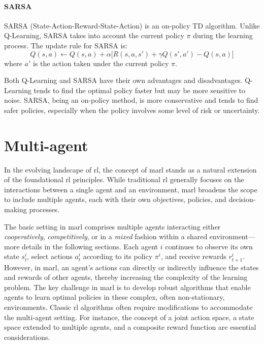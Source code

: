  \paragraph*{SARSA}
 SARSA (State-Action-Reward-State-Action) is an on-policy TD algorithm. 
  Unlike Q-Learning, SARSA takes into account the current policy \(\pi\) during the learning process. The update rule for SARSA is:
 \begin{equation}
 Q(s, a) \leftarrow Q(s, a) + \alpha \Big[ R(s, a, s') + \gamma Q(s', a') - Q(s, a) \Big]
 \end{equation}
 where \(a'\) is the action taken under the current policy \(\pi\).
 
 Both Q-Learning and SARSA have their own advantages and disadvantages. 
  Q-Learning tends to find the optimal policy faster but may be more sensitive to noise. SARSA, being an on-policy method, is more conservative and tends to find safer policies, especially when the policy involves some level of risk or uncertainty.


\section{Multi-agent}
In the evolving landscape of \ac{rl}, the concept of \ac{marl} stands as a natural extension of the foundational \ac{rl} principles. 
 While traditional \ac{rl} generally focuses on the interactions between a single agent and an environment, 
 \ac{marl} broadens the scope to include multiple agents, 
 each with their own objectives, policies, and decision-making processes.

The basic setting in \ac{marl} comprises multiple agents interacting either \emph{cooperatively}, \emph{competitively}, or in a \emph{mixed} fashion within a shared environment---more details in the following sections. 
 Each agent $i$ continues to observe its own state $s_{t}^{i}$, select actions $a_{t}^{i}$ according to its policy $\pi^{i}$, and receive rewards $r_{t+1}^{i}$.
 However, in \ac{marl}, 
 an agent's actions can directly or indirectly influence the states and rewards of other agents, 
 thereby increasing the complexity of the learning problem.
The key challenge in \ac{marl} is to develop robust algorithms that enable agents to learn optimal policies in these complex, often non-stationary, environments. Classic \ac{rl} algorithms often require modifications to accommodate the multi-agent setting. For instance, the concept of a joint action space, a state space extended to multiple agents, and a composite reward function are essential considerations.
